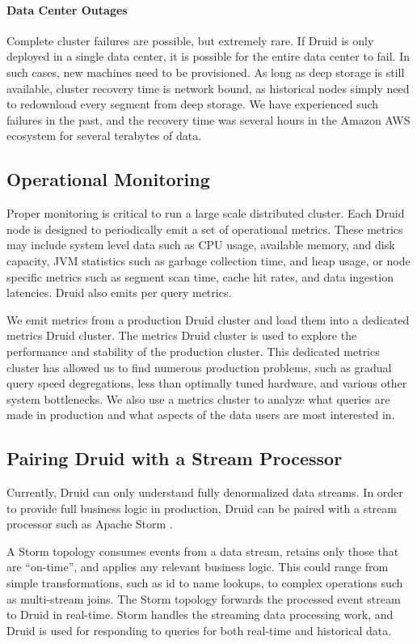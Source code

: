 \documentclass{sig-alternate-2013}
\begin{document}
\paragraph{Data Center Outages}
Complete cluster failures are possible, but extremely rare. If Druid is
only deployed in a single data center, it is possible for the entire data
center to fail. In such cases, new machines need to be provisioned. As long as
deep storage is still available, cluster recovery time is network bound, as
historical nodes simply need to redownload every segment from deep storage. We
have experienced such failures in the past, and the recovery time was
several hours in the Amazon AWS ecosystem for several terabytes of data.

\subsection{Operational Monitoring}
Proper monitoring is critical to run a large scale distributed cluster.
Each Druid node is designed to periodically emit a set of operational metrics.
These metrics may include system level data such as CPU usage, available
memory, and disk capacity, JVM statistics such as garbage collection time, and
heap usage, or node specific metrics such as segment scan time, cache
hit rates, and data ingestion latencies. Druid also emits per query metrics.

We emit metrics from a production Druid cluster and load them into a dedicated
metrics Druid cluster. The metrics Druid cluster is used to explore the
performance and stability of the production cluster. This dedicated metrics
cluster has allowed us to find numerous production problems, such as gradual
query speed degregations, less than optimally tuned hardware, and various other
system bottlenecks. We also use a metrics cluster to analyze what queries are
made in production and what aspects of the data users are most interested in.

\subsection{Pairing Druid with a Stream Processor}
Currently, Druid can only understand fully denormalized data
streams. In order to provide full business logic in production, Druid can be
paired with a stream processor such as Apache Storm \cite{marz2013storm}.

A Storm topology consumes events from a data stream, retains only those that are
“on-time”, and applies any relevant business logic. This could range from
simple transformations, such as id to name lookups, to complex operations
such as multi-stream joins. The Storm topology forwards the processed event
stream to Druid in real-time. Storm handles the streaming data processing work,
and Druid is used for responding to queries for both real-time and
historical data.
\end{document}

